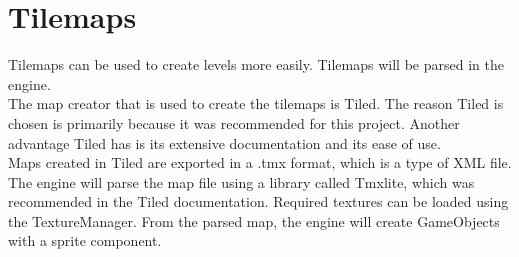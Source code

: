 \section{Tilemaps}
Tilemaps can be used to create levels more easily.
Tilemaps will be parsed in the engine.
\\
The map creator that is used to create the tilemaps is Tiled.
The reason Tiled is chosen is primarily because it was recommended for this project.
Another advantage Tiled has is its extensive documentation and its ease of use.
\\
Maps created in Tiled are exported in a .tmx format, which is a type of XML file.
The engine will parse the map file using a library called Tmxlite, which was recommended in the Tiled documentation.
Required textures can be loaded using the TextureManager.
From the parsed map, the engine will create GameObjects with a sprite component.